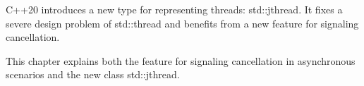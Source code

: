 C++20 introduces a new type for representing threads: std::jthread. It fixes a severe design problem of std::thread and benefits from a new feature for signaling cancellation.

This chapter explains both the feature for signaling cancellation in asynchronous scenarios and the new class std::jthread.